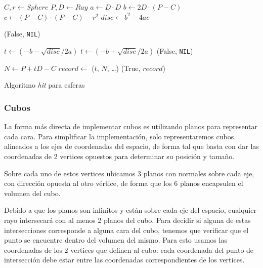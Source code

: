 \begin{algorithm}
\begin{algorithmic}[1]
    \State $C, r \gets Sphere$ 
    \State $P, D \gets Ray$ 
    \State $a \gets D \cdot D$
    \State $b \gets 2D \cdot (P - C)$
    \State $c \gets (P - C) \cdot (P - C) - r^2$
    \State $disc \gets b^2 - 4ac$

        \State \Return (False, \texttt{NIL})
    \EndIf

    \State $t \gets (-b - \sqrt{disc} / 2a)$
        \State $t \gets (-b + \sqrt{disc} / 2a)$
            \State \Return (False, \texttt{NIL})
        \EndIf
    \EndIf

    \State $N \gets P + tD - C$ 
    \State $record \gets$ ($t$, $N$, \dots) 
    \State \Return (True, $record$)
\EndFunction
\end{algorithmic}
\caption{Algoritmo \textit{hit} para esferas}
\label{alg:sphere-hit}
\end{algorithm}

\subsubsection{Cubos}

La forma más directa de implementar cubos es utilizando planos para representar
cada cara. Para simplificar la implementación, solo representaremos cubos
alineados a los ejes de coordenadas del espacio, de forma tal que basta con dar
las coordenadas de 2 vertices opuestos para determinar su posición y tamaño.

Sobre cada uno de estos vertices ubicamos 3 planos con normales sobre cada eje,
con dirección opuesta al otro vértice, de forma que los 6 planos encapsulen el
volumen del cubo.


Debido a que los planos son infinitos y están sobre cada eje del espacio,
cualquier rayo intersecará con al menos 2 planos del cubo. Para decidir si
alguna de estas intersecciones corresponde a alguna cara del cubo, tenemos que
verificar que el punto se encuentre dentro del volumen del mismo. Para esto
usamos las coordenadas de los 2 vertices que definen al cubo: cada coordenada
del punto de intersección debe estar entre las coordenadas correspondientes de
los vertices.

